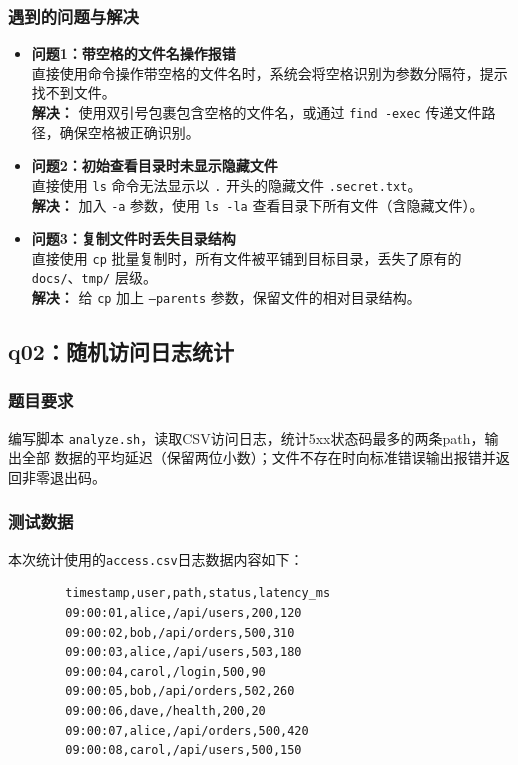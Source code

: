 \documentclass{article}
\begin{document}
	\subsubsection{遇到的问题与解决}
	\begin{itemize}
		\item \textbf{问题1：带空格的文件名操作报错}
		\\ 直接使用命令操作带空格的文件名时，系统会将空格识别为参数分隔符，提示找不到文件。
		\\ \textbf{解决：} 使用双引号包裹包含空格的文件名，或通过 \texttt{find -exec} 传递文件路径，确保空格被正确识别。
		\item \textbf{问题2：初始查看目录时未显示隐藏文件}
		\\ 直接使用 \texttt{ls} 命令无法显示以 \texttt{.} 开头的隐藏文件 \texttt{.secret.txt}。
		\\ \textbf{解决：} 加入 \texttt{-a} 参数，使用 \texttt{ls -la} 查看目录下所有文件（含隐藏文件）。
		\item \textbf{问题3：复制文件时丢失目录结构}
		\\ 直接使用 \texttt{cp} 批量复制时，所有文件被平铺到目标目录，丢失了原有的 \texttt{docs/}、\texttt{tmp/} 层级。
		\\ \textbf{解决：} 给 \texttt{cp} 加上 \texttt{--parents} 参数，保留文件的相对目录结构。
	\end{itemize}
	
	\subsection{q02：随机访问日志统计}
	\subsubsection{题目要求}
	编写脚本 \texttt{analyze.sh}，读取CSV访问日志，统计5xx状态码最多的两条path，输出全部
	数据的平均延迟（保留两位小数）；文件不存在时向标准错误输出报错并返回非零退出码。
	
	\subsubsection{测试数据}
	本次统计使用的\texttt{access.csv}日志数据内容如下：
	\begin{verbatim}
		timestamp,user,path,status,latency_ms
		09:00:01,alice,/api/users,200,120
		09:00:02,bob,/api/orders,500,310
		09:00:03,alice,/api/users,503,180
		09:00:04,carol,/login,500,90
		09:00:05,bob,/api/orders,502,260
		09:00:06,dave,/health,200,20
		09:00:07,alice,/api/orders,500,420
		09:00:08,carol,/api/users,500,150
	\end{verbatim}
	
\end{document}
